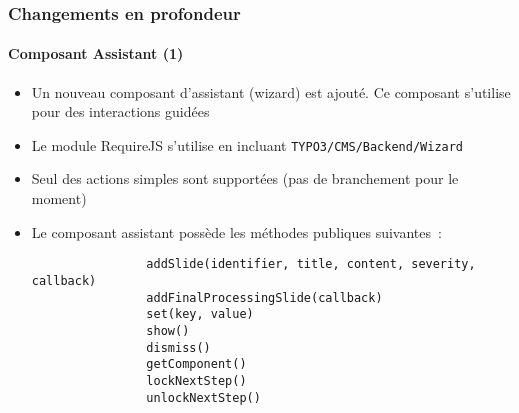 \begin{frame}[fragile]
	\frametitle{Changements en profondeur}
	\framesubtitle{Composant Assistant (1)}

	\lstset{basicstyle=\tiny\ttfamily}

	\begin{itemize}

		\item Un nouveau composant d'assistant (wizard) est ajouté.
			Ce composant s'utilise pour des interactions guidées

		\item Le module RequireJS s'utilise en incluant \texttt{TYPO3/CMS/Backend/Wizard}

		\item Seul des actions simples sont supportées\newline
			(pas de branchement pour le moment)

		\item Le composant assistant possède les méthodes publiques suivantes~:

			\begin{lstlisting}
				addSlide(identifier, title, content, severity, callback)
				addFinalProcessingSlide(callback)
				set(key, value)
				show()
				dismiss()
				getComponent()
				lockNextStep()
				unlockNextStep()
			\end{lstlisting}

	\end{itemize}

\end{frame}

